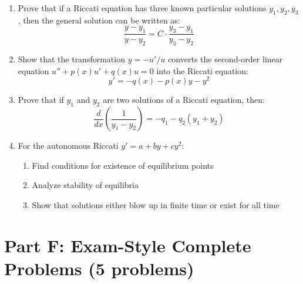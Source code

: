 \documentclass[12pt]{article}
\begin{document}
\begin{enumerate}[resume]
    \item Prove that if a Riccati equation has three known particular solutions $y_1, y_2, y_3$, then the general solution can be written as:
    $$\frac{y - y_1}{y - y_2} = C \cdot \frac{y_3 - y_1}{y_3 - y_2}$$

    \item Show that the transformation $y = -u'/u$ converts the second-order linear equation $u'' + p(x)u' + q(x)u = 0$ into the Riccati equation:
    $$y' = -q(x) - p(x)y - y^2$$

    \item Prove that if $y_1$ and $y_2$ are two solutions of a Riccati equation, then:
    $$\frac{d}{dx}\left(\frac{1}{y_1 - y_2}\right) = -q_1 - q_2(y_1 + y_2)$$

    \item For the autonomous Riccati $y' = a + by + cy^2$:
    \begin{enumerate}[label=(\alph*)]
        \item Find conditions for existence of equilibrium points
        \item Analyze stability of equilibria
        \item Show that solutions either blow up in finite time or exist for all time
    \end{enumerate}
\end{enumerate}

\section*{Part F: Exam-Style Complete Problems (5 problems)}
\end{document}
